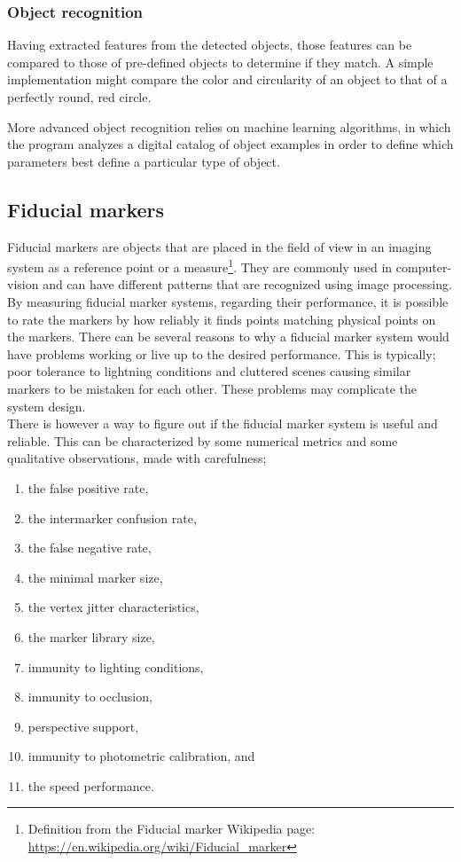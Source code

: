 			\subsubsection{Object recognition}
				Having extracted features from the detected objects, those features can be compared to those of pre-defined objects to determine if they match. A simple implementation might compare the color and circularity of an object to that of a perfectly round, red circle. 
				
				More advanced object recognition relies on machine learning algorithms, in which the program analyzes a digital catalog of object examples in order to define which parameters best define a particular type of object.
			
			
			\subsection{Fiducial markers}\label{sec:fiducialMarkers}
			Fiducial markers are objects that are placed in the field of view in an imaging system as a reference point or a measure\footnote{Definition from the Fiducial marker Wikipedia page: \url{https://en.wikipedia.org/wiki/Fiducial_marker}}. They are commonly used in computer-vision and can have different patterns that are recognized using image processing. By measuring fiducial marker systems, regarding their performance, it is possible to rate the markers by how reliably it finds points matching physical points on the markers. There can be several reasons to why a fiducial marker system would have problems working or live up to the desired performance. This is typically; poor tolerance to lightning conditions and cluttered scenes causing similar markers to be mistaken for each other\cite{fiducialMarkers}. These problems may complicate the system design.\\
			
			There is however a way to figure out if the fiducial marker system is useful and reliable. This can be characterized by some numerical metrics and some qualitative observations, made with carefulness;\\
			\begin{enumerate}
				\item the false positive rate,
				\item the intermarker confusion rate,
				\item the false negative rate,
				\item the minimal marker size,
				\item the vertex jitter characteristics,
				\item the marker library size,
				\item immunity to lighting conditions,
				\item immunity to occlusion,
				\item perspective support,
				\item immunity to photometric calibration, and
				\item the speed performance.\\
			\end{enumerate}
			
